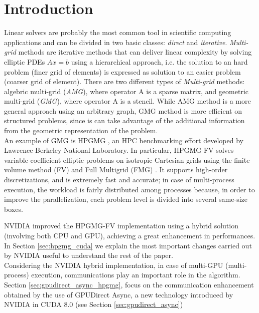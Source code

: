 \documentclass[conference]{IEEEtran}
\begin{document}
\section{Introduction}\label{sec:introduction}
Linear solvers are probably the most common tool in scientific computing applications and can be divided in two basic classes: \emph{direct} and \emph{iterative}.
\emph{Multi-grid} methods are iterative methods that can deliver linear complexity by solving elliptic PDEs $Ax=b$ using a hierarchical approach, i.e. the solution to an hard problem (finer grid of elements) is expressed as solution to an easier problem (coarser grid of element).
There are two different types of \emph{Multi-grid} methods: algebric multi-grid (\emph{AMG}), where operator A is a sparse matrix, and geometric multi-grid (\emph{GMG}), where operator A is a stencil. While AMG method is a more general approach using an arbitrary graph, GMG method is more efficient on structured problems, since is can take advantage of the additional information from the geometric representation of the problem.\\

An example of GMG is HPGMG \cite{HPGMG}, an HPC benchmarking effort developed by Lawrence Berkeley National Laboratory. In particular, HPGMG-FV solves variable-coefficient elliptic problems on isotropic Cartesian grids using the finite volume method (FV) \cite{finitevolume} and Full Multigrid (FMG) \cite{fullmultigrid}. It supports high-order discretizations, and is extremely fast and accurate; in case of multi-process execution, the workload is fairly distributed among processes because, in order to improve the parallelization, each problem level is divided into several same-size boxes.

NVIDIA improved the HPGMG-FV implementation \cite{HPGMG_NVIDIA} using a hybrid solution (involving both CPU and GPU), achieving a great enhancement in performances. In Section \ref{sec:hpgmg_cuda} we explain the most important changes carried out by NVIDIA useful to understand the rest of the paper.\\

Considering the NVIDIA hybrid implementation, in case of multi-GPU (multi-process) execution, communications play an important role in the algorithm. Section \ref{sec:gpudirect_async_hpgmg}, focus on the communication enhancement obtained by the use of GPUDirect Async, a new technology introduced by NVIDIA in CUDA 8.0 (see Section \ref{sec:gpudirect_async})
\end{document}
